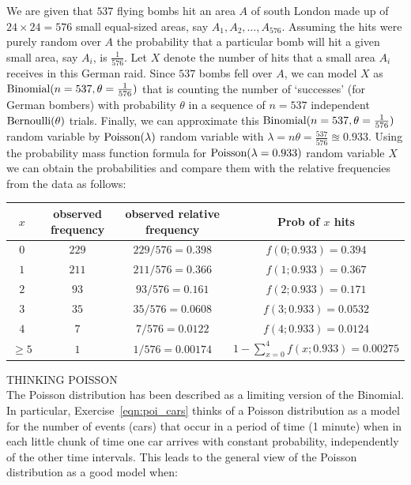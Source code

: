 \begin{Answer}
We are given that $537$ flying bombs hit an area $A$ of south London made up of $24 \times 24=576$ small equal-sized areas, say $A_1,A_2,\ldots,A_{576}$.  
Assuming the hits were purely random over $A$ the probability that a particular bomb will hit a given small area, say $A_i$, is $\frac{1}{576}$.  
Let $X$ denote the number of hits that a small area $A_i$ receives in this German raid.  
Since $537$ bombs fell over $A$, we can model $X$ as $\mbox{{\rm Binomial}}(n=537,\theta=\frac{1}{576})$ that is counting the number of `successes' (for German bombers) with probability $\theta$ in a sequence of $n=537$ independent $\mbox{{\rm Bernoulli}}(\theta)$ trials.  
Finally, we can approximate this $\mbox{{\rm Binomial}}(n=537,\theta=\frac{1}{576})$ random variable by $\mbox{{\rm Poisson}}(\lambda)$ random variable with $\lambda=n\theta=\frac{537}{576} \approxeq 0.933$.
Using the probability mass function formula for $\mbox{{\rm Poisson}}(\lambda=0.933)$ random variable $X$ we can obtain the probabilities and compare them with the relative frequencies from the data as follows:

\begin{center}
{\small
\begin{tabular}{|c|c|c|c|}
\hline
$x$ & observed frequency & observed relative frequency & Prob of $x$ hits\\\hline
$0$ & $229$ & $229/576=0.398$ & $f(0;0.933) = 0.394$\\
$1$ & $211$ & $211/576=0.366$ & $f(1;0.933) = 0.367$\\
$2$ & $93$ & $93/576=0.161$ & $f(2;0.933) = 0.171$\\
$3$ & $35$ & $35/576=0.0608$ & $f(3;0.933) = 0.0532$\\
$4$ & $7$ & $7/576=0.0122$ & $f(4;0.933) = 0.0124$\\
$\geq 5$ & $1$ & $1/576=0.00174$ & $1-\sum_{x=0}^4f(x;0.933) = 0.00275$\\\hline
\end{tabular}
}
\end{center}
\end{Answer}

\bigskip

\begin{framed}
THINKING POISSON\\

The Poisson distribution has been described as a limiting version of the
Binomial. In particular, Exercise~\ref{eqn:poi_cars} thinks of a Poisson distribution as a model for the number of events (cars) that occur in a period of time (1 minute) when in each little chunk of time one car arrives with constant probability, independently of the other time intervals. This leads to the general view of the Poisson distribution as a good model when:



\end{framed}


